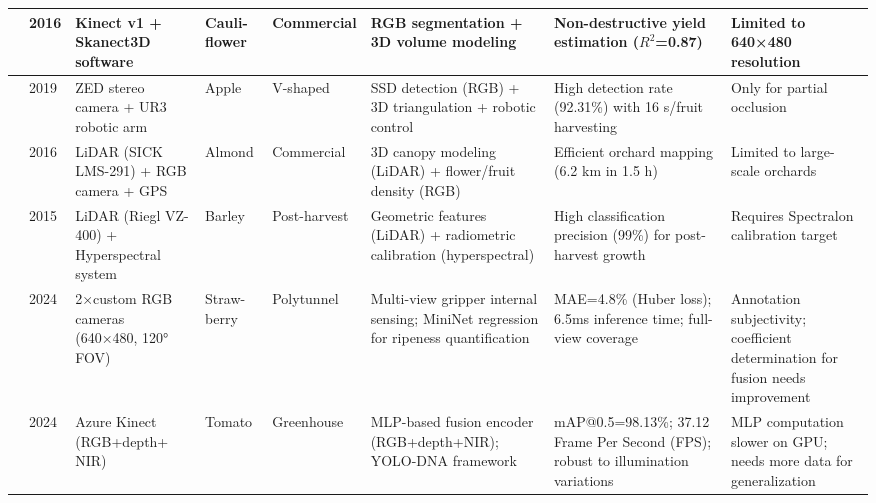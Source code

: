 \documentclass[pdflatex,sn-mathphys-num]{sn-jnl}
\begin{document}
\begin{table}[ht]
\begin{tabular}{p{1.2cm}p{0.8cm}p{2.5cm}p{1cm}p{1.3cm}p{3cm}p{4cm}p{2.5cm}}
\hline
\cite{andujar2016using} & 2016 & Kinect v1 + Skanect3D software & Cauli- flower & Commercial & RGB segmentation + 3D volume modeling & Non-destructive yield estimation ($R^2$=0.87) & Limited to 640×480 resolution \\ 
\hline
\cite{onishi2019automated} & 2019 & ZED stereo camera + UR3 robotic arm & Apple & V-shaped & SSD detection (RGB) + 3D triangulation + robotic control & High detection rate (92.31\%) with 16 s/fruit harvesting & Only for partial occlusion \\ 
\hline
\cite{underwood2016mapping} & 2016 & LiDAR (SICK LMS-291) + RGB camera + GPS & Almond & Commercial & 3D canopy modeling (LiDAR) + flower/fruit density (RGB) & Efficient orchard mapping (6.2 km in 1.5 h) & Limited to large-scale orchards  \\ 
\hline
\cite{koenig2015comparative} & 2015 & LiDAR (Riegl VZ-400) + Hyperspectral system & Barley & Post-harvest & Geometric features (LiDAR) + radiometric calibration (hyperspectral) & High classification precision (99\%) for post-harvest growth & Requires Spectralon calibration target  \\ 
\hline
\cite{ge2024multi} & 2024 & 2×custom RGB cameras (640×480, 120° FOV) & Straw- berry & Polytunnel & Multi-view gripper internal sensing; MiniNet regression for ripeness quantification & MAE=4.8\% (Huber loss); 6.5ms inference time; full-view coverage & Annotation subjectivity; coefficient determination for fusion needs improvement \\
\hline
\cite{chen2024mlp} & 2024 & Azure Kinect (RGB+depth+ NIR) & Tomato & Greenhouse & MLP-based fusion encoder (RGB+depth+NIR); YOLO-DNA framework & mAP@0.5=98.13\%; 37.12 Frame Per Second (FPS); robust to illumination variations & MLP computation slower on GPU; needs more data for generalization  \\
\hline
\end{tabular}
\end{table}
\end{document}
